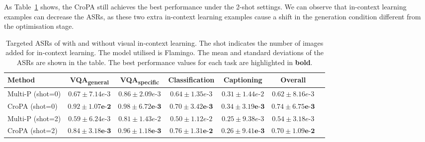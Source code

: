As Table~\ref{tab:icl} shows, the CroPA still achieves the best performance under the 2-shot settings.  We can observe that in-context learning examples can decrease the ASRs, as these two extra in-context learning examples cause a shift in the generation condition different from the optimisation stage. 

\begin{table}[ht]
\centering
\caption{Targeted ASRs of with and without visual in-context learning. The shot indicates the number of images added for in-context learning. The model utilised is Flamingo. The mean and standard deviations of the ASRs are shown in the table. The best performance values for each task are highlighted in \textbf{bold}.}\vspace{-0.2cm} \label{tab:icl}
\footnotesize
\begin{tabular}{lcccccc}
 \hline
 Method &VQA\textsubscript{general} &VQA\textsubscript{specific} &Classification &Captioning & Overall \\
 \hline
 Multi-P (shot=0) 
 & $0.67\scriptscriptstyle \pm \scriptstyle7.14e\text{-}3$
 & $0.86\scriptscriptstyle \pm \scriptstyle2.09e\text{-}3$
 & $0.64\scriptscriptstyle \pm \scriptstyle1.35e\text{-}3$
 & $0.31\scriptscriptstyle \pm \scriptstyle1.44e\text{-}2$
 & $0.62\scriptscriptstyle \pm \scriptstyle8.16e\text{-}3$ \\
 CroPA (shot=0) 
 & $\mathbf{0.92\scriptscriptstyle \pm \scriptstyle1.07e\text{-}2}$
 & $\mathbf{0.98\scriptscriptstyle \pm \scriptstyle6.72e\text{-}3}$
 & $\mathbf{0.70\scriptscriptstyle \pm \scriptstyle3.42e\text{-}3}$
 & $\mathbf{0.34\scriptscriptstyle \pm \scriptstyle3.19e\text{-}3}$
 & $\mathbf{0.74\scriptscriptstyle \pm \scriptstyle6.75e\text{-}3}$ \\
 \hline
 Multi-P (shot=2) 
 & $0.59\scriptscriptstyle \pm \scriptstyle6.24e\text{-}3$
 & $0.81\scriptscriptstyle \pm \scriptstyle1.43e\text{-}2$
 & $0.50\scriptscriptstyle \pm \scriptstyle1.12e\text{-}2$
 & $0.25\scriptscriptstyle \pm \scriptstyle9.38e\text{-}3$
 & $0.54\scriptscriptstyle \pm \scriptstyle3.18e\text{-}3$ \\
 CroPA (shot=2) 
 & $\mathbf{0.84\scriptscriptstyle \pm \scriptstyle3.18e\text{-}3}$
 & $\mathbf{0.96\scriptscriptstyle \pm \scriptstyle1.18e\text{-}3}$
 & $\mathbf{0.76\scriptscriptstyle \pm \scriptstyle1.31e\text{-}2}$
 & $\mathbf{0.26\scriptscriptstyle \pm \scriptstyle9.41e\text{-}3}$
 & $\mathbf{0.70\scriptscriptstyle \pm \scriptstyle1.09e\text{-}2}$ \\
\hline
\end{tabular}
\end{table}
\vspace{-0.2cm}


